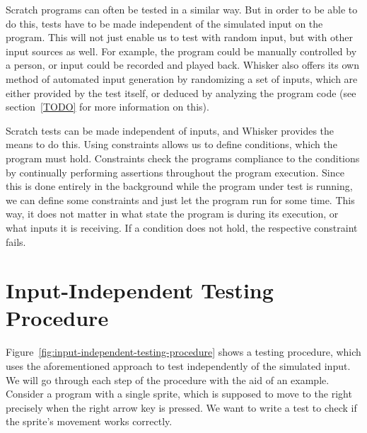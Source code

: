 Scratch programs can often be tested in a similar way.
But in order to be able to do this, tests have to be made independent of the simulated input on the program.
This will not just enable us to test with random input, but with other input sources as well.
For example, the program could be manually controlled by a person, or input could be recorded and played back.
Whisker also offers its own method of automated input generation by randomizing a set of inputs,
which are either provided by the test itself, or deduced by analyzing the program code (see section~\ref{TODO} for more information on this).
\parspace

Scratch tests can be made independent of inputs, and Whisker provides the means to do this.
Using constraints allows us to define conditions, which the program must hold.
Constraints check the programs compliance to the conditions by continually performing assertions throughout the program execution.
Since this is done entirely in the background while the program under test is running, we can define some constraints and just let the program run for some time.
This way, it does not matter in what state the program is during its execution, or what inputs it is receiving.
If a condition does not hold, the respective constraint fails.

\section{Input-Independent Testing Procedure}

Figure~\ref{fig:input-independent-testing-procedure} shows a testing procedure, which uses the aforementioned approach to test independently of the simulated input.
We will go through each step of the procedure with the aid of an example.
Consider a program with a single sprite, which is supposed to move to the right precisely when the right arrow key is pressed.
We want to write a test to check if the sprite's movement works correctly.

